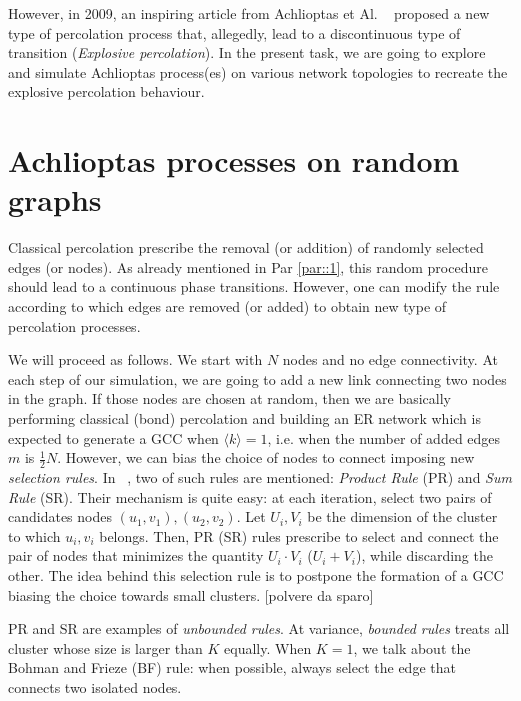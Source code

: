 However, in 2009, an inspiring article from Achlioptas et Al. ~\cite{Achlioptas} proposed a new type of percolation process that, allegedly, lead to a discontinuous type of transition (\textit{Explosive percolation}). In the present task, we are going to explore and simulate Achlioptas process(es) on various network topologies to recreate the explosive percolation behaviour.
\label{par::1}

\section{Achlioptas processes on random graphs}
Classical percolation prescribe the removal (or addition) of randomly selected edges (or nodes). As already mentioned in Par \ref{par::1}, this random procedure should lead to a continuous phase transitions. However, one can modify the rule according to which edges are removed (or added) to obtain new type of percolation processes.

We will proceed as follows. We start with $N$ nodes and no edge connectivity. At each step of our simulation, we are going to add a new link connecting two nodes in the graph. If those nodes are chosen at random, then we are basically performing classical (bond) percolation and building an ER network which is expected to generate a GCC when $\langle k \rangle = 1$, i.e. when the number of added edges $m$ is $\frac{1}{2}N$. However, we can bias the choice of nodes to connect imposing new \textit{selection rules}. In ~\cite{Achlioptas}, two of such rules are mentioned: \textit{Product Rule} (PR) and \textit{Sum Rule} (SR). Their mechanism is quite easy: at each iteration, select two pairs of candidates nodes $(u_1, v_1), (u_2, v_2)$. Let $U_i, V_i$ be the dimension of the cluster to which $u_i, v_i$ belongs. Then, PR (SR) rules prescribe to select and connect the pair of nodes that minimizes the quantity $U_i \cdot V_i$ ($U_i + V_i$), while discarding the other. The idea behind this selection rule is to postpone the formation of a GCC biasing the choice towards small clusters. [polvere da sparo]

PR and SR are examples of \textit{unbounded rules}. At variance, \textit{bounded rules} treats all cluster whose size is larger than $K$ equally. When $K=1$, we talk about the Bohman and Frieze (BF) rule: when possible, always select the edge that connects two isolated nodes. 

